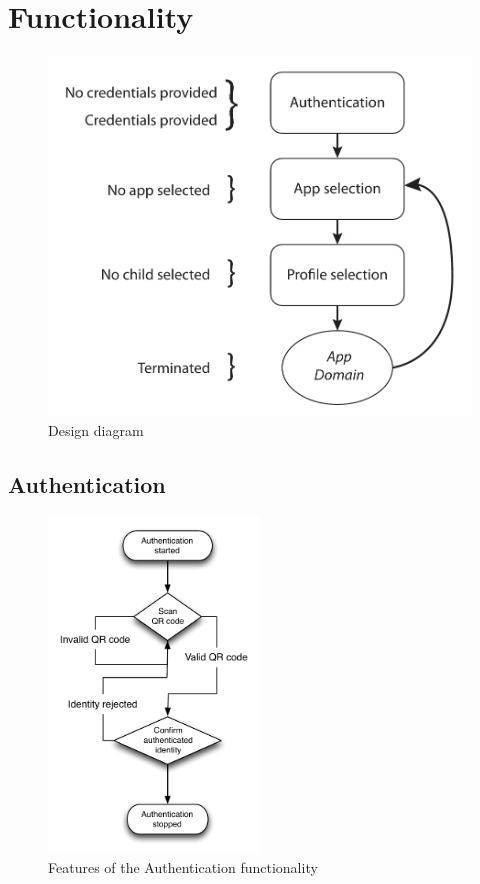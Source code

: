\section{Functionality}
\begin{figure}[h]
	\centering
	\includegraphics[width=1\textwidth]{gfx/design_diagram.pdf}
	\caption{Design diagram}
	\label{fig:design_diagram}
\end{figure}
\subsection{Authentication}
\begin{figure}[h]
	\centering
	\includegraphics[width=0.5\textwidth]{gfx/authentication_design.pdf}
	\caption{Features of the Authentication functionality}
	\label{fig:authentication_design}
\end{figure}
